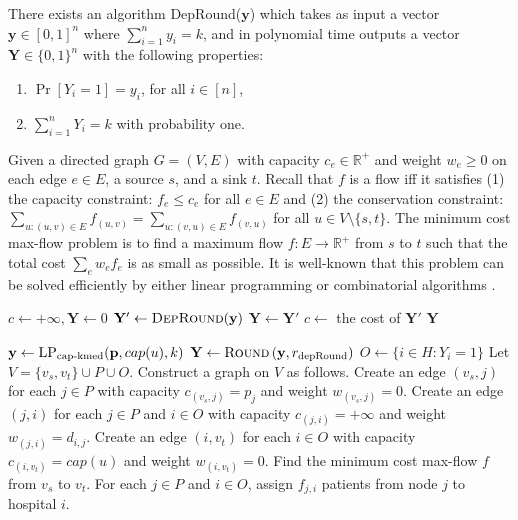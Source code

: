 \begin{proposition}
\label{prop:dep-round}
There exists an algorithm {\sc DepRound}($\mathbf{y}$) which takes as input a vector $\mathbf{y} \in [0,1]^n$ where $\sum_{i=1}^n y_i = k$, and in polynomial time outputs a vector $\mathbf{Y} \in \{0,1\}^n$  with the following properties:
\begin{enumerate}
\item $\Pr[Y_i = 1] = y_i$, for all $i \in [n]$,
\item $\sum_{i=1}^n Y_i = k$ with probability one.
\end{enumerate}
\end{proposition} 

Given a directed graph $G = (V, E)$ with capacity $c_e \in \mathbb{R}^+$ and weight $w_e \geq 0$ on each edge $e \in E$, a source $s$, and a sink $t$. Recall that $f$ is a flow iff it satisfies (1) the capacity constraint: $f_e \leq c_e$ for all $e \in E$ and (2) the conservation constraint: $\sum_{u:(u,v)\in E} f_{(u,v)} = \sum_{u:(v,u) \in E} f_{(v,u)}$ for all $u \in V \setminus \{s, t\}$. The minimum cost max-flow problem is to find a maximum flow $f: E \to \mathbb{R}^+$ from $s$ to $t$ such that the total cost $\sum_e w_e f_e$ is as small as possible.  It is well-known that this problem can be solved efficiently by either linear programming or combinatorial algorithms \cite{flow_book, flow_goldberg, Orlin1997}.


\begin{algorithm}[h]
\caption{$\textsc{Round}\left( \mathbf{y}, r \right)$}
\begin{algorithmic}[1]
\STATE $c \gets +\infty, \mathbf{Y} \gets 0$
	\STATE $\mathbf{Y}' \gets \textsc{DepRound}(\mathbf{y})$
		\STATE $\mathbf{Y} \gets \mathbf{Y}'$
		\STATE $c \gets $ the cost of $\mathbf{Y}'$
	\ENDIF
\ENDFOR
\RETURN $\mathbf{Y}$
\end{algorithmic} 
\end{algorithm}

\begin{algorithm}[h]
\caption{$\algokmedstatic \left(H, P, \mathbf{p}, w, \ell, r_{\text{depRound}} \right)$}
\label{algo:kmedstatic}
\begin{algorithmic}[1]
\STATE {}
\STATE $\mathbf{y} \gets \text{LP}_{\text{cap-kmed}}(\mathbf{p}, cap(u), k)$
\STATE $\mathbf{Y} \gets \textsc{Round}\left( \mathbf{y}, r_{\text{depRound}} \right)$
\STATE $O \gets \{i \in H: Y_i = 1\}$
\STATE Let $V = \{v_s, v_t\} \cup P  \cup O$. Construct a graph on $V$ as follows.
\STATE Create an edge $(v_s, j)$ for each $j \in P$ with capacity $c_{(v_s, j)} = p_j$ and weight $w_{(v_s, j)} = 0$.
\STATE Create an edge $(j, i)$ for each $j \in P$ and $i \in O$ with capacity $c_{(j, i)} = +\infty$ and weight $w_{(j, i)} = d_{i, j}$.
\STATE Create an edge $(i, v_t)$ for each $i \in O$ with capacity $c_{(i, v_t)} = cap(u)$ and weight $w_{(i, v_t)} = 0$.
\STATE Find the minimum cost max-flow $f$ from $v_s$ to $v_t$. For each $j \in P$ and $i \in O$, assign $f_{j,i}$ patients from node $j$ to hospital $i$.
\end{algorithmic} 
\end{algorithm}

